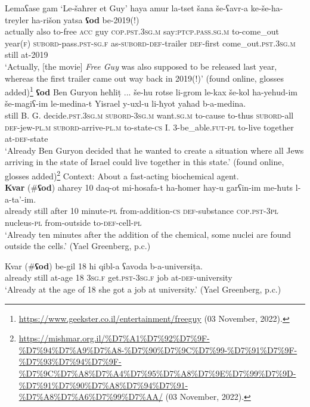 \begin{exe}
	\ex \gll Lemaʕase gam \lq{}Le-šaħrer et Guy\rq{} haya amur la-tset šana še-ʕavr-a ke-še-ha-treyler ha-rišon yatsa \textbf{ʕod} be-2019(!)\\
	actually also \phantom{\lq}to-free \textsc{acc} guy \textsc{cop}.\textsc{pst}.3\textsc{sg}.\textsc{m} say:\textsc{ptcp}.\textsc{pass}.\textsc{sg}.\textsc{m} to-come\_out year(\textsc{f}) \textsc{subord}-pass.\textsc{pst}-\textsc{sg}.\textsc{f} as-\textsc{subord}-\textsc{def}-trailer \textsc{def}-first come\_out.\textsc{pst}.3\textsc{sg}.\textsc{m} still at-2019\\
	\glt \lq Actually, [the movie] \textit{Free Guy} was also supposed to be released last year, whereas the first trailer came out way back in 2019(!)\rq{ }(found online, glosses added)\footnote{\url{https://www.geekster.co.il/entertainment/freeguy} (03 November, 2022).}
	\largerpage
	\ex
	\gll \textbf{ʕod} {Ben Guryon} heħliṭ ... še-hu rotse li-grom le-kax še-kol ha-yehud-im še-magiʕ-im le-medina-t Yisrael y-uxl-u li-ħyot yaħad b-a-medina.\\
	still {B. G.} decide.\textsc{pst}.3\textsc{sg}.\textsc{m} {} \textsc{subord}-3\textsc{sg}.\textsc{m} want.\textsc{sg}.\textsc{m} to-cause to-thus \textsc{subord}-all \textsc{def}-jew-\textsc{pl}.\textsc{m} \textsc{subord}-arrive-\textsc{pl}.\textsc{m} to-state-\textsc{cs} I. 3-be\_able.\textsc{fut}-\textsc{pl} to-live together at-\textsc{def}-state\\
	\glt \lq Already Ben Guryon decided that he wanted to create a situation where all Jews arriving in the state of Israel could live together in this state.\rq{ }(found online, glosses added){\footnote{\url{https://mishmar.org.il/\%D7\%A1\%D7\%92\%D7\%9F-\%D7\%94\%D7\%A9\%D7\%A8-\%D7\%90\%D7\%9C\%D7\%99-\%D7\%91\%D7\%9F-\%D7\%93\%D7\%94\%D7\%9F-\%D7\%9C\%D7\%A8\%D7\%A4\%D7\%95\%D7\%A8\%D7\%9E\%D7\%99\%D7\%9D-\%D7\%91\%D7\%90\%D7\%A8\%D7\%94\%D7\%91-\%D7\%A8\%D7\%A6\%D7\%99\%D7\%AA/} (03 November, 2022).}}
	\ex\label{exAppendixHebrewOdTimeScalar5}
	 Context: About a fast-acting biochemical agent.\\
	\gll \textbf{Kvar} (\#\textbf{ʕod})  aħarey 10 daq-ot mi-hosafa-t ha-ħomer hay-u garʕin-im me-ħuts l-a-ta’-im.\\
	already \phantom{\#(}still after 10 minute-\textsc{pl} from-addition-\textsc{cs} \textsc{def}-substance \textsc{cop}.\textsc{pst}-3\textsc{pl} nucleus-\textsc{pl} from-outside to-\textsc{def}-cell-\textsc{pl}\\
	\glt \lq Already ten minutes after the addition of the chemical, some nuclei are found outside the cells.\rq{ }(Yael Greenberg, p.c.)
	
	\ex\label{exAppendixHebrewOdTimeScalar6}
	\gll Kvar (\#\textbf{ʕod})  be-gil 18 hi qibl-a ʕavoda b-a-universiṭa.\\
	already \phantom{(\#}still at-age 18 3\textsc{sg}.\textsc{f} get.\textsc{pst}-3\textsc{sg}.\textsc{f} job at-\textsc{def}-university\\
	\glt \lq Already at the age of 18 she got a job at university.\rq{ }(Yael Greenberg, p.c.)
\end{exe}

